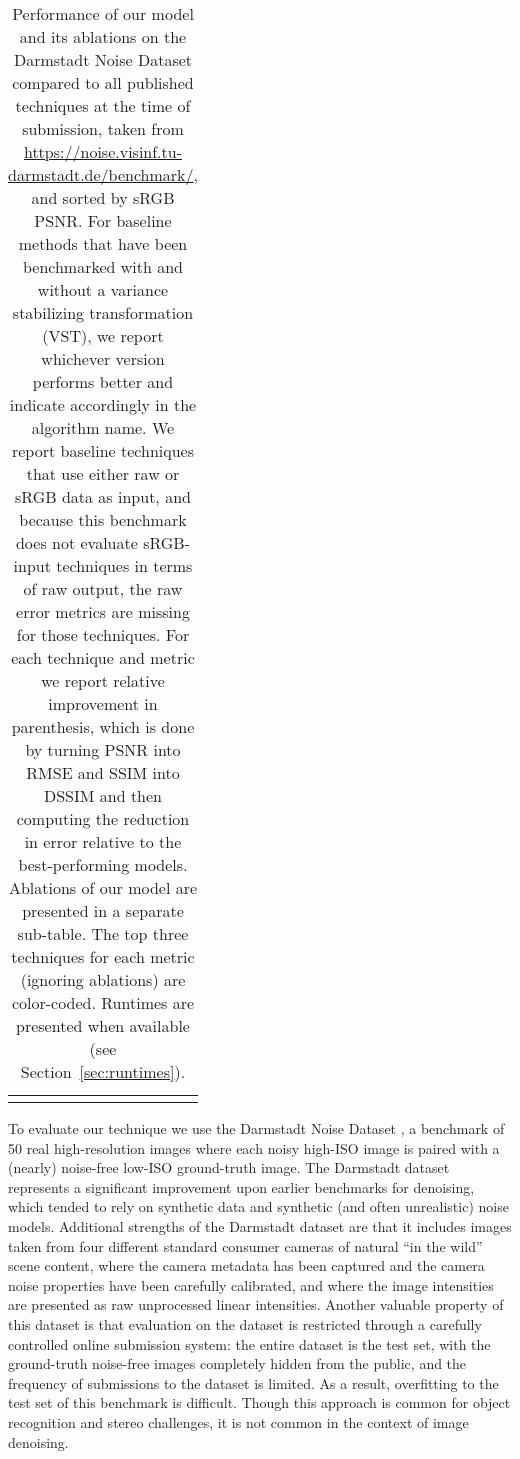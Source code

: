 \documentclass[10pt,twocolumn,letterpaper]{article}
\begin{document}
\begin{table*}[]
\begin{center}
{\begin{tabular}{ l || cc|cc || cc|cc || c }
 \multicolumn{10}{c}{} \\
\end{tabular}
}
\caption{Performance of our model and its ablations on the Darmstadt Noise Dataset \cite{plotz2017cvpr} compared to all published techniques at the time of submission, taken from \url{https://noise.visinf.tu-darmstadt.de/benchmark/}, and sorted by sRGB PSNR. For baseline methods that have been benchmarked with and without a variance stabilizing transformation (VST), we report whichever version performs better and indicate accordingly in the algorithm name.
We report baseline techniques that use either raw or sRGB data as input, and because this benchmark does not evaluate sRGB-input techniques in terms of raw output, the raw error metrics are missing for those techniques.
For each technique and metric we report relative improvement in parenthesis, which is done by turning PSNR into RMSE and SSIM into DSSIM and then computing the reduction in error relative to the best-performing models.
Ablations of our model are presented in a separate sub-table.
The top three techniques for each metric (ignoring ablations) are color-coded.
Runtimes are presented when available (see Section~\ref{sec:runtimes}).
\label{table:darmstadt}}
\end{center}
\end{table*}

To evaluate our technique we use the Darmstadt Noise Dataset \cite{plotz2017cvpr}, a benchmark of 50 real high-resolution images where each noisy high-ISO image is paired with a (nearly) noise-free low-ISO ground-truth image.
The Darmstadt dataset represents a significant improvement upon earlier benchmarks for denoising, which tended to rely on synthetic data and synthetic (and often unrealistic) noise models.
Additional strengths of the Darmstadt dataset are that it includes images taken from four different standard consumer cameras of natural ``in the wild'' scene content, where the camera metadata has been captured and the camera noise properties have been carefully calibrated, and where the image intensities are presented as raw unprocessed linear intensities.
Another valuable property of this dataset is that evaluation on the dataset is restricted through a carefully controlled online submission system: the entire dataset is the test set, with the ground-truth noise-free images completely hidden from the public, and the frequency of submissions to the dataset is limited. As a result, overfitting to the test set of this benchmark is difficult.
Though this approach is common for object recognition \cite{Everingham2010} and stereo \cite{Middlebury} challenges, it is not common in the context of image denoising.
\end{document}
